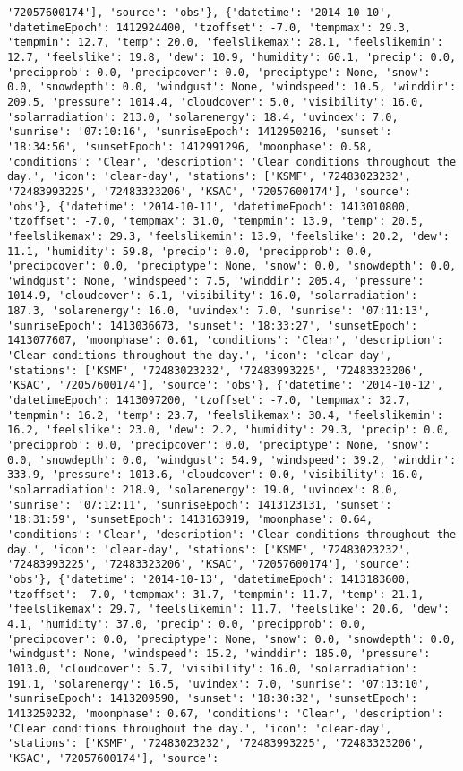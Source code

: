 \documentclass[
  letterpaper,
  DIV=11,
  numbers=noendperiod]{scrartcl}
\begin{document}
\begin{verbatim}
'72057600174'], 'source': 'obs'}, {'datetime': '2014-10-10', 'datetimeEpoch': 1412924400, 'tzoffset': -7.0, 'tempmax': 29.3, 'tempmin': 12.7, 'temp': 20.0, 'feelslikemax': 28.1, 'feelslikemin': 12.7, 'feelslike': 19.8, 'dew': 10.9, 'humidity': 60.1, 'precip': 0.0, 'precipprob': 0.0, 'precipcover': 0.0, 'preciptype': None, 'snow': 0.0, 'snowdepth': 0.0, 'windgust': None, 'windspeed': 10.5, 'winddir': 209.5, 'pressure': 1014.4, 'cloudcover': 5.0, 'visibility': 16.0, 'solarradiation': 213.0, 'solarenergy': 18.4, 'uvindex': 7.0, 'sunrise': '07:10:16', 'sunriseEpoch': 1412950216, 'sunset': '18:34:56', 'sunsetEpoch': 1412991296, 'moonphase': 0.58, 'conditions': 'Clear', 'description': 'Clear conditions throughout the day.', 'icon': 'clear-day', 'stations': ['KSMF', '72483023232', '72483993225', '72483323206', 'KSAC', '72057600174'], 'source': 'obs'}, {'datetime': '2014-10-11', 'datetimeEpoch': 1413010800, 'tzoffset': -7.0, 'tempmax': 31.0, 'tempmin': 13.9, 'temp': 20.5, 'feelslikemax': 29.3, 'feelslikemin': 13.9, 'feelslike': 20.2, 'dew': 11.1, 'humidity': 59.8, 'precip': 0.0, 'precipprob': 0.0, 'precipcover': 0.0, 'preciptype': None, 'snow': 0.0, 'snowdepth': 0.0, 'windgust': None, 'windspeed': 7.5, 'winddir': 205.4, 'pressure': 1014.9, 'cloudcover': 6.1, 'visibility': 16.0, 'solarradiation': 187.3, 'solarenergy': 16.0, 'uvindex': 7.0, 'sunrise': '07:11:13', 'sunriseEpoch': 1413036673, 'sunset': '18:33:27', 'sunsetEpoch': 1413077607, 'moonphase': 0.61, 'conditions': 'Clear', 'description': 'Clear conditions throughout the day.', 'icon': 'clear-day', 'stations': ['KSMF', '72483023232', '72483993225', '72483323206', 'KSAC', '72057600174'], 'source': 'obs'}, {'datetime': '2014-10-12', 'datetimeEpoch': 1413097200, 'tzoffset': -7.0, 'tempmax': 32.7, 'tempmin': 16.2, 'temp': 23.7, 'feelslikemax': 30.4, 'feelslikemin': 16.2, 'feelslike': 23.0, 'dew': 2.2, 'humidity': 29.3, 'precip': 0.0, 'precipprob': 0.0, 'precipcover': 0.0, 'preciptype': None, 'snow': 0.0, 'snowdepth': 0.0, 'windgust': 54.9, 'windspeed': 39.2, 'winddir': 333.9, 'pressure': 1013.6, 'cloudcover': 0.0, 'visibility': 16.0, 'solarradiation': 218.9, 'solarenergy': 19.0, 'uvindex': 8.0, 'sunrise': '07:12:11', 'sunriseEpoch': 1413123131, 'sunset': '18:31:59', 'sunsetEpoch': 1413163919, 'moonphase': 0.64, 'conditions': 'Clear', 'description': 'Clear conditions throughout the day.', 'icon': 'clear-day', 'stations': ['KSMF', '72483023232', '72483993225', '72483323206', 'KSAC', '72057600174'], 'source': 'obs'}, {'datetime': '2014-10-13', 'datetimeEpoch': 1413183600, 'tzoffset': -7.0, 'tempmax': 31.7, 'tempmin': 11.7, 'temp': 21.1, 'feelslikemax': 29.7, 'feelslikemin': 11.7, 'feelslike': 20.6, 'dew': 4.1, 'humidity': 37.0, 'precip': 0.0, 'precipprob': 0.0, 'precipcover': 0.0, 'preciptype': None, 'snow': 0.0, 'snowdepth': 0.0, 'windgust': None, 'windspeed': 15.2, 'winddir': 185.0, 'pressure': 1013.0, 'cloudcover': 5.7, 'visibility': 16.0, 'solarradiation': 191.1, 'solarenergy': 16.5, 'uvindex': 7.0, 'sunrise': '07:13:10', 'sunriseEpoch': 1413209590, 'sunset': '18:30:32', 'sunsetEpoch': 1413250232, 'moonphase': 0.67, 'conditions': 'Clear', 'description': 'Clear conditions throughout the day.', 'icon': 'clear-day', 'stations': ['KSMF', '72483023232', '72483993225', '72483323206', 'KSAC', '72057600174'], 'source': 
\end{verbatim}
\end{document}
